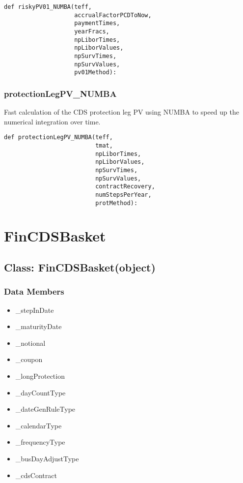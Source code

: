 \documentclass[twoside,11pt]{book}
\begin{document}
\begin{lstlisting}
def riskyPV01_NUMBA(teff,
                    accrualFactorPCDToNow,
                    paymentTimes,
                    yearFracs,
                    npLiborTimes,
                    npLiborValues,
                    npSurvTimes,
                    npSurvValues,
                    pv01Method):
\end{lstlisting}

\subsubsection*{{\bf protectionLegPV\_NUMBA}}
Fast calculation of the CDS protection leg PV using NUMBA to speed up the numerical integration over time.  

\begin{lstlisting}
def protectionLegPV_NUMBA(teff,
                          tmat,
                          npLiborTimes,
                          npLiborValues,
                          npSurvTimes,
                          npSurvValues,
                          contractRecovery,
                          numStepsPerYear,
                          protMethod):
\end{lstlisting}

\newpage
\section{FinCDSBasket}

\subsection*{Class: FinCDSBasket(object)}


\subsubsection*{Data Members}
\begin{itemize}
\item{\_stepInDate}
\item{\_maturityDate}
\item{\_notional}
\item{\_coupon}
\item{\_longProtection}
\item{\_dayCountType}
\item{\_dateGenRuleType}
\item{\_calendarType}
\item{\_frequencyType}
\item{\_busDayAdjustType}
\item{\_cdsContract}
\end{itemize}
\end{document}
